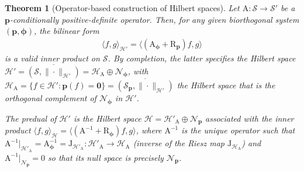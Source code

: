 \documentclass[11pt, english,english]{article}
\newtheorem{theorem}{Theorem}
\def\V#1{{\boldsymbol{#1}}}         %
\def\Spc#1{{\mathcal{#1}}}  %
\def\Op#1{{\mathrm{#1}}}  %
\renewcommand{\[}{\begin{equation}}
\renewcommand{\]}[1]{\label{eq:#1}\end{equation}}
\begin{document}
\begin{theorem}[Operator-based construction of Hilbert spaces]
\label{Theo:conditionPos}
Let $\Op A: \Spc S \to \Spc S'$ be a $\V p$-conditionally positive-definite operator.
Then, for any given biorthogonal system $(\V p, \V \phi)$, the bilinear form
\begin{align}
\label{Eq:BPinnerA}
\langle f,g\rangle_{\Spc H'}=\langle(\Op A_{\V \phi} + \Op R_{\V p}) f,g\rangle
\end{align}
is a valid inner product on $\Spc S$. By completion, the latter specifies the Hilbert space $\Spc H'=\overline{(\Spc S,\|\cdot\|_{\Spc H'})}=\Spc H_{\Op A} \oplus \Spc N_{\V \phi}$, with
$\Spc H_{\Op A}=\{f \in \Spc H': \V p(f)=\V 0\}=\overline{(\Spc S_{\V p},\|\cdot\|_{\Spc H'})}$ the Hilbert space that is the orthogonal complement of $ \Spc N_{\V \phi}$ in $\Spc H'$. 

The predual of $\Spc H'$
is the Hilbert space $\Spc H=\Spc H'_{\Op A} \oplus \Spc N_{\V p}$ associated with the inner product $\langle f,g\rangle_{\Spc H}=\langle(\Op A^{-1} + \Op R_{\V \phi}) f,g\rangle$,
where $\Op A^{-1}$ is the unique operator such that $\Op A^{-1}|_{\Spc H'_{\Op A}}=\Op A_{\V \phi}^{-1}=\Op J_{\Spc H'_{\Op A}}: \Spc H'_{\Op A} \to \Spc H_{\Op A}$ (inverse of the Riesz map $\Op J_{\Spc H_{\Op A}}$) and $\Op A^{-1}|_{\Spc N_{\V p}}=0$ so that its null space is precisely $\Spc N_{\V p}$.

\end{theorem}
\end{document}
